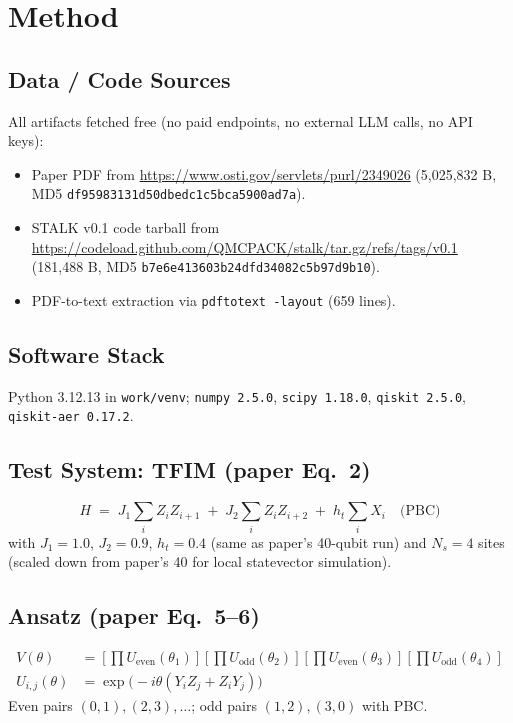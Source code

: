 \documentclass[11pt]{article}
\begin{document}
\section{Method}

\subsection{Data / Code Sources}

All artifacts fetched free (no paid endpoints, no external LLM calls, no API keys):
\begin{itemize}
  \item Paper PDF from \url{https://www.osti.gov/servlets/purl/2349026} (5,025,832 B, MD5 \texttt{df95983131d50dbedc1c5bca5900ad7a}).
  \item STALK v0.1 code tarball from \url{https://codeload.github.com/QMCPACK/stalk/tar.gz/refs/tags/v0.1} (181,488 B, MD5 \texttt{b7e6e413603b24dfd34082c5b97d9b10}).
  \item PDF-to-text extraction via \texttt{pdftotext -layout} (659 lines).
\end{itemize}

\subsection{Software Stack}

Python 3.12.13 in \texttt{work/venv}; \texttt{numpy 2.5.0}, \texttt{scipy 1.18.0},
\texttt{qiskit 2.5.0}, \texttt{qiskit-aer 0.17.2}.

\subsection{Test System: TFIM (paper Eq.~2)}
\begin{equation}
H \;=\; J_1 \sum_i Z_i Z_{i+1} \;+\; J_2 \sum_i Z_i Z_{i+2} \;+\; h_t \sum_i X_i \quad \text{(PBC)}
\end{equation}
with $J_1=1.0$, $J_2=0.9$, $h_t=0.4$ (same as paper's 40-qubit run) and $N_s=4$ sites
(scaled down from paper's 40 for local statevector simulation).

\subsection{Ansatz (paper Eq.~5--6)}
\begin{align}
V(\theta) &= \left[\prod U_{\text{even}}(\theta_1)\right]
             \left[\prod U_{\text{odd}}(\theta_2)\right]
             \left[\prod U_{\text{even}}(\theta_3)\right]
             \left[\prod U_{\text{odd}}(\theta_4)\right] \\
U_{i,j}(\theta) &= \exp\!\big(-i\theta (Y_i Z_j + Z_i Y_j)\big)
\end{align}
Even pairs $(0,1),(2,3),\dots$; odd pairs $(1,2),(3,0)$ with PBC.
\end{document}
